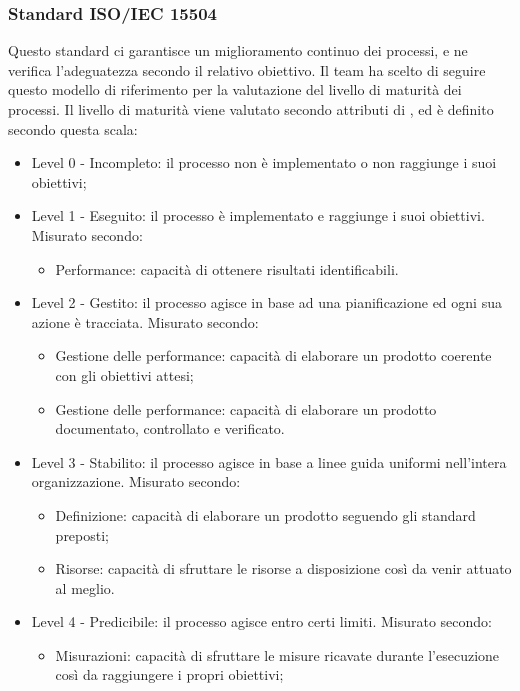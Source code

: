 \documentclass[../PianoDiQualifica.tex]{subfiles}
\begin{document}
		\subsubsection{Standard ISO/IEC 15504}
		Questo standard ci garantisce un miglioramento continuo dei processi, e ne verifica l'adeguatezza secondo il relativo obiettivo. Il team ha scelto di seguire questo modello di riferimento per la valutazione del livello di maturità dei processi. Il livello di maturità viene valutato secondo attributi di , ed è definito secondo questa scala:
		\begin{itemize}
			\item Level 0 - Incompleto: il processo non è implementato o non raggiunge i suoi obiettivi;
			\item Level 1 - Eseguito: il processo è implementato e raggiunge i suoi obiettivi.
			Misurato secondo:
				\begin{itemize}
					\item Performance: capacità di ottenere risultati identificabili.
				\end{itemize}
			\item Level 2 - Gestito: il processo agisce in base ad una pianificazione ed ogni sua azione è tracciata.
			Misurato secondo:
				\begin{itemize}
					\item Gestione delle performance: capacità di elaborare un prodotto coerente con gli obiettivi attesi;
					\item Gestione delle performance: capacità di elaborare un prodotto documentato, controllato e verificato.
				\end{itemize}
			\item Level 3 - Stabilito: il processo agisce in base a linee guida uniformi nell'intera organizzazione.
			Misurato secondo:
				\begin{itemize}
					\item Definizione: capacità di elaborare un prodotto seguendo gli standard preposti;
					\item Risorse: capacità di sfruttare le risorse a disposizione così da venir attuato al meglio.
				\end{itemize}
			\item Level 4 - Predicibile: il processo agisce entro certi limiti.
			Misurato secondo:
				\begin{itemize}
					\item Misurazioni: capacità di sfruttare le misure ricavate durante l'esecuzione così da raggiungere i propri obiettivi;

\end{itemize}
\end{itemize}
\end{document}
